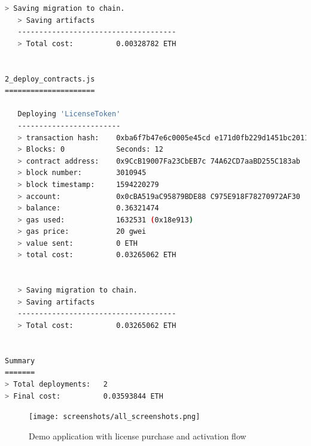 \documentclass{egpubl}
\begin{document}
\begin{lstlisting}[language=bash, caption=Deploy smart-contract, label=lst:deployContract]
   > Saving migration to chain.
   > Saving artifacts
   -------------------------------------
   > Total cost:          0.00328782 ETH


2_deploy_contracts.js
=====================

   Deploying 'LicenseToken'
   ------------------------
   > transaction hash:    0xba6f7b47e6c0005e45cd e171d0fb229d1451bc20114cdf7e1eaf87c aa650e86f
   > Blocks: 0            Seconds: 12
   > contract address:    0x9CcB19007Fa23CbEB7c 74A62CD7aaBD255C183ab
   > block number:        3010945
   > block timestamp:     1594220279
   > account:             0x0cBA519aC95879BDE88 C975E918F78270972AF30
   > balance:             0.36321474
   > gas used:            1632531 (0x18e913)
   > gas price:           20 gwei
   > value sent:          0 ETH
   > total cost:          0.03265062 ETH


   > Saving migration to chain.
   > Saving artifacts
   -------------------------------------
   > Total cost:          0.03265062 ETH


Summary
=======
> Total deployments:   2
> Final cost:          0.03593844 ETH
\end{lstlisting}


\FloatBarrier

\begin{figure}[h]
	\centering
	\setlength{\fboxsep}{1pt}
   	\setlength{\fboxrule}{1pt}	
	\texttt{[image: screenshots/all\_screenshots.png]}
	\caption{Demo application with license purchase and activation flow}
	\label{img:demoAppScreenshots}
\end{figure}
\end{document}
